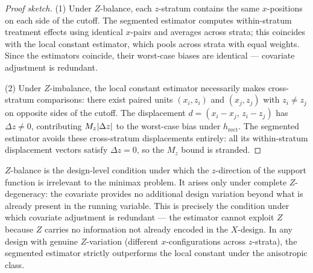\begin{proof}[Proof sketch]
	(1) Under $Z$-balance, each $z$-stratum contains the same $x$-positions on each side of the cutoff.
	The segmented estimator computes within-stratum treatment effects using identical $x$-pairs and averages across strata; this coincides with the local constant estimator, which pools across strata with equal weights.
	Since the estimators coincide, their worst-case biases are identical --- covariate adjustment is redundant.

	(2) Under $Z$-imbalance, the local constant estimator necessarily makes cross-stratum comparisons: there exist paired units $(x_i, z_i)$ and $(x_j, z_j)$ with $z_i \neq z_j$ on opposite sides of the cutoff.
	The displacement $d = (x_i - x_j,\, z_i - z_j)$ has $\Delta z \neq 0$, contributing $M_z\lvert\Delta z\rvert$ to the worst-case bias under $h_{\mathrm{rect}}$.
	The segmented estimator avoids these cross-stratum displacements entirely: all its within-stratum displacement vectors satisfy $\Delta z = 0$, so the $M_z$ bound is stranded.
\end{proof}

\begin{remark}
	$Z$-balance is the design-level condition under which the $z$-direction of the support function is irrelevant to the minimax problem.
	It arises only under complete $Z$-degeneracy: the covariate provides no additional design variation beyond what is already present in the running variable.
	This is precisely the condition under which covariate adjustment is redundant --- the estimator cannot exploit $Z$ because $Z$ carries no information not already encoded in the $X$-design.
	In any design with genuine $Z$-variation (different $x$-configurations across $z$-strata), the segmented estimator strictly outperforms the local constant under the anisotropic class.
\end{remark}

